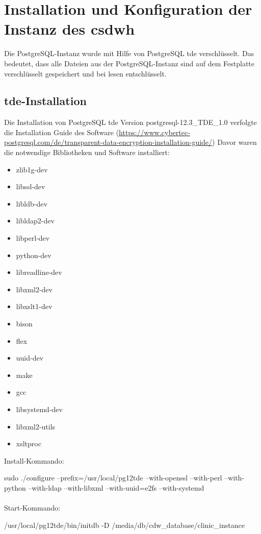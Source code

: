 \chapter{Installation und Konfiguration der Instanz des \acs{csdwh}}
    
    Die PostgreSQL-Instanz wurde mit Hilfe von PostgreSQL \ac{tde} verschlüsselt. Das bedeutet, dass alle Dateien aus der PostgreSQL-Instanz sind auf dem Festplatte verschlüsselt gespeichert und bei lesen entschlüsselt.
    \section{\acs{tde}-Installation}    
    Die Installation von PostgreSQL \ac{tde} Version postgresql-12.3\_TDE\_1.0 verfolgte die Installation Guide des Software (\url{https://www.cybertec-postgresql.com/de/transparent-data-encryption-installation-guide/}) Davor waren die notwendige Bibliotheken und Software installiert:
    \begin{itemize}
    	\item zlib1g-dev   
    	\item libssl-dev
    	\item libldb-dev
    	\item libldap2-dev
    	\item libperl-dev
    	\item python-dev
    	\item libreadline-dev
    	\item libxml2-dev
    	\item libxslt1-dev
    	\item bison
    	\item flex
    	\item uuid-dev
    	\item make
    	\item gcc
    	\item libsystemd-dev
    	\item libxml2-utils
    	\item xsltproc
    \end{itemize}
    Install-Kommando: 
    
       
    sudo ./configure --prefix=/usr/local/pg12tde --with-openssl --with-perl --with-python --with-ldap --with-libxml --with-uuid=e2fs --with-systemd\\ \\
    Start-Kommando: 
    
    /usr/local/pg12tde/bin/initdb -D /media/db/cdw\_database/clinic\_instance
    

